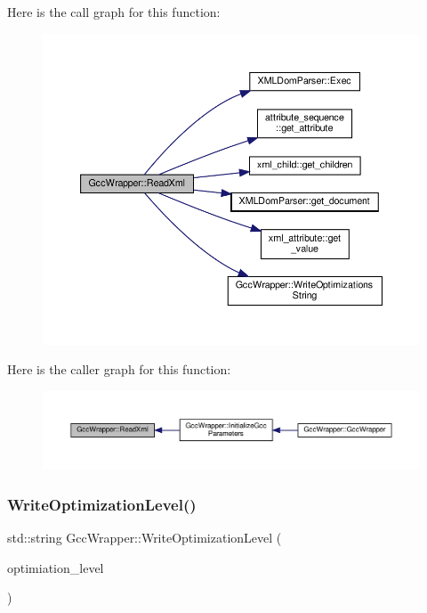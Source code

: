Here is the call graph for this function\+:
\nopagebreak
\begin{figure}[H]
\begin{center}
\leavevmode
\includegraphics[width=350pt]{d4/dbf/classGccWrapper_a89445158bf3052bd6dfaca4372016516_cgraph}
\end{center}
\end{figure}
Here is the caller graph for this function\+:
\nopagebreak
\begin{figure}[H]
\begin{center}
\leavevmode
\includegraphics[width=350pt]{d4/dbf/classGccWrapper_a89445158bf3052bd6dfaca4372016516_icgraph}
\end{center}
\end{figure}
\mbox{\label{classGccWrapper_a5df0314ce8643d1216b6981a333dc385}} 
\subsubsection{\texorpdfstring{Write\+Optimization\+Level()}{WriteOptimizationLevel()}}
{\footnotesize\ttfamily std\+::string Gcc\+Wrapper\+::\+Write\+Optimization\+Level (\begin{DoxyParamCaption}\item[{const \hyperlink{gcc__wrapper_8hpp_a0f57d29a8e8442ddf6d2cd8577c6788d}{Gcc\+Wrapper\+\_\+\+Optimization\+Set}}]{optimiation\+\_\+level }\end{DoxyParamCaption})\hspace{0.3cm}{\ttfamily [static]}}



